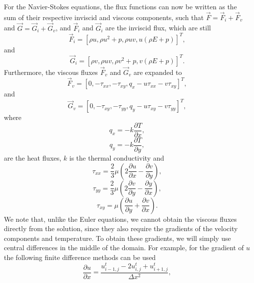 For the Navier-Stokes equations, the flux functions can now be written as the sum of their respective inviscid and viscous components, such that $\vec{F} = \vec{F}_i + \vec{F}_v$ and $\vec{G} = \vec{G}_i + \vec{G}_v$, and $\vec{F}_i$ and $\vec{G}_i$ are the inviscid flux, which are still
\begin{equation}
	\vec{F}_i = [\rho u,\rho u^2 + p, \rho uv, u(\rho E+p)]^T,
\end{equation}
and
\begin{equation}
	\vec{G}_i = [\rho v,\rho u v, \rho v^2+p, v(\rho E+p)]^T.
\end{equation}
Furthermore, the viscous fluxes $\vec{F}_v$ and $\vec{G}_v$ are expanded to
\begin{equation}
	\vec{F}_v = [0,-\tau_{xx}, -\tau_{xy}, q_x-u\tau_{xx}-v\tau_{xy}]^T,
\end{equation}
and
\begin{equation}
	\vec{G}_v = [0,-\tau_{xy}, -\tau_{yy}, q_y-u\tau_{xy}-v\tau_{yy}]^T,
\end{equation}
where 
\begin{equation}
	q_x = -k \frac{\partial T}{\partial x},
\end{equation} 
\begin{equation}
 q_y = -k \frac{\partial T}{\partial y},
\end{equation} 
are the heat fluxes, $k$ is the thermal conductivity and
\begin{equation}
	\tau_{xx} = \frac{2}{3}\mu\left(2 \frac{\partial u}{\partial x} - \frac{\partial v}{\partial y} \right),
\end{equation}
\begin{equation}
	\tau_{yy} = \frac{2}{3}\mu\left(2 \frac{\partial v}{\partial y} - \frac{\partial y}{\partial x} \right),
\end{equation}
\begin{equation}
	\tau_{xy} = \mu \left(\frac{\partial u}{\partial y} + \frac{\partial v}{\partial x}\right).
\end{equation}
We note that, unlike the Euler equations, we cannot obtain the viscous fluxes directly from the solution, since they also require the gradients of the velocity components and temperature. To obtain these gradients, we will simply use central differences in the middle of the domain. For example, for the gradient of $u$ the following finite difference methods can be used
\begin{equation}
	\frac{\partial u}{\partial x} = \frac{u_{i-1,j}^t - 2 u_{i,j}^t + u_{i+1,j}^t}{\Delta x^2},
\end{equation}
